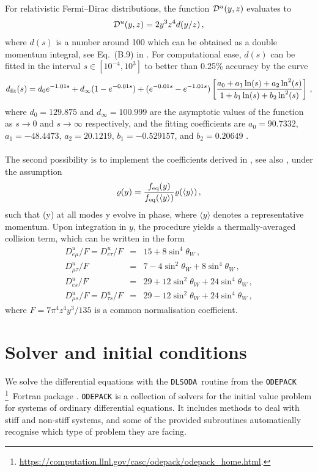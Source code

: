 \documentclass[notitlepage,nofootinbib,showpacs,preprintnumbers,amsmath,amssymb,superscriptaddress,prd,onecolumn]{revtex4-1}
\newcommand{\dlsoda}{\texttt{DLSODA}}
\begin{document}
For relativistic Fermi--Dirac distributions, the function ${\cal D}^u(y,z)$ evaluates to
\begin{equation}
{\cal D}^u(y,z) = 2 y^3 z^4 d(y/z)\,,
\label{eq:dy}
\end{equation}
where $d(s)$ is a number around 100 which can be obtained as a double momentum integral,
see Eq.~(B.9) in \cite{Bennett:2020zkv}.
For computational ease,
$d(s)$ can be fitted in the interval $s \in [10^{-4},10^3]$ to better than 0.25\% accuracy by the curve
\begin{equation}
d_{\rm fit}(s)
=
d_0 e^{-1.01 s}
+
d_\infty (1- e^{-0.01 s})
+
(e^{-0.01 s}-e^{-1.01 s})
\left[
\frac{a_0 + a_1 \ln  (s) + a_2 \ln^2(s)}{1 + b_1 \ln  (s) + b_2 \ln^2(s)}
\right]\,,
\label{eq:fittingfunctiondy}
\end{equation}
where $d_0 = 129.875$ and $d_\infty = 100.999$ are the asymptotic values of the function as $s \to 0$ and
$s \to \infty$ respectively, and the fitting coefficients are
$a_0 = 90.7332$, $a_1 = -48.4473$, $a_2 =20.1219$,
$b_1 = -0.529157$, and $b_2 = 0.20649$ \cite{Bennett:2020zkv}.



\paragraph{}
The second possibility is to implement the coefficients derived in \cite{McKellar:1992ja},
see also \cite{Enqvist:1991qj,Bell:1998ds},
under the assumption
\begin{equation}
\varrho(y)
=
\frac{
f_{\rm eq}(y)
}{
f_{\rm eq}(\langle y\rangle)
}
\varrho(\langle y\rangle)\,,
\end{equation}
such that (y) at all modes y evolve in phase,
where $\langle y\rangle$ denotes a representative momentum.
Upon integration in $y$,
the procedure yields a thermally-averaged collision term,
which can be written in the form
%
\begin{eqnarray}
D^u_{e\mu}/F=D^u_{e\tau}/F & = & 15 + 8\sin^4\theta_W\,,\\
D^u_{\mu\tau}/F & = & 7 - 4\sin^2\theta_W + 8\sin^4\theta_W\,,\\
D^u_{es}/F & = & 29 + 12\sin^2\theta_W + 24\sin^4\theta_W\,,\\
D^u_{\mu s}/F = D^u_{\tau s}/F & = & 29 - 12\sin^2\theta_W + 24\sin^4\theta_W\,,
\end{eqnarray}
where
$F=7\pi^4 z^4 y^3/135$ is a common normalisation coefficient.


\section{Solver and initial conditions}
\label{sec:solver}
We solve the differential equations with the \dlsoda\ routine
from the \texttt{ODEPACK}%
\footnote{\url{https://computation.llnl.gov/casc/odepack/odepack_home.html}.}\
Fortran package \cite{hindmarsh1982odepack,dlsoda1}.
\texttt{ODEPACK} is a collection of solvers for the initial value problem for systems of ordinary differential equations.
It includes methods to deal with stiff and non-stiff systems, and some of the provided subroutines
automatically recognise which type of problem they are facing.
\end{document}
